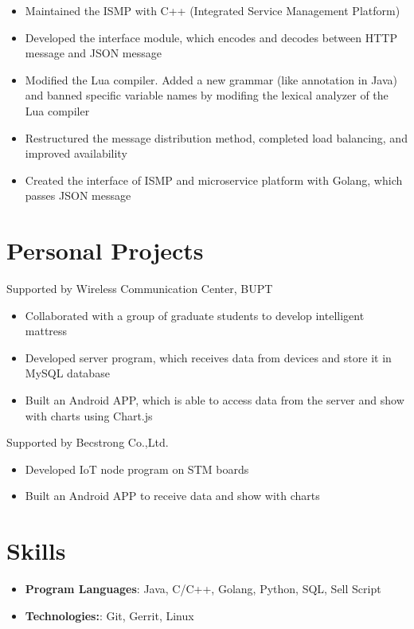 \documentclass{resume}
\begin{document}
\begin{itemize}[parsep=0.25ex]
    \item Maintained the ISMP with C++ (Integrated Service Management Platform)
    \item Developed the interface module, which encodes and decodes between HTTP message and JSON message
    \item Modified the Lua compiler. Added a new grammar (like annotation in Java) and banned specific variable names by modifing the lexical analyzer of the Lua compiler
    \item Restructured the message distribution method, completed load balancing, and improved availability
    \item Created the interface of ISMP and microservice platform with Golang, which passes JSON message
\end{itemize}

\section{Personal Projects}
Supported by Wireless Communication Center, BUPT
\begin{itemize}[parsep=0.25ex]
    \item Collaborated with a group of graduate students to develop intelligent mattress
    \item Developed server program, which receives data from devices and store it in MySQL database
    \item Built an Android APP, which is able to access data from the server and show with charts using Chart.js
\end{itemize}
Supported by Becstrong Co.,Ltd.
\begin{itemize}[parsep=0.25ex]
    \item Developed IoT node program on STM boards
    \item Built an Android APP to receive data and show with charts
\end{itemize}

\section{Skills}
\begin{itemize}[parsep=0.25ex]
    \item
          \textbf{Program Languages}:
          Java, C/C++, Golang, Python, SQL, Sell Script
    \item
          \textbf{Technologies:}:
          Git, Gerrit, Linux
\end{itemize}
\end{document}
